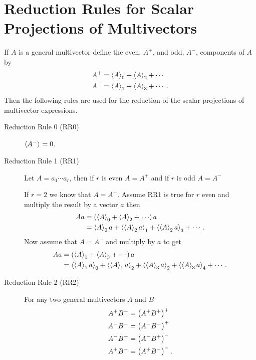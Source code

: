 \chapter{Reduction Rules for Scalar Projections of Multivectors}\label{RRrules}
If $A$ is a general multivector define the even, $A^{+}$, and odd, $A^{-}$, components of $A$ by
\begin{align}
	A^{+} &= \left \langle {A} \right \rangle_{0}+\left \langle {A} \right \rangle_{2}+\cdots \\
	A^{-} &= \left \langle {A} \right \rangle_{1}+\left \langle {A} \right \rangle_{3}+\cdots. 
\end{align}
Then the following rules are used for the reduction of the scalar projections of multivector expressions.
\begin{description}
	\item[Reduction Rule 0 (RR0)] $\left \langle {A^{-}} \right \rangle_{} = 0$. 
	\item[Reduction Rule 1 (RR1)] Let $A=a_{1}\cdots a_{r}$, then if $r$ is even $A = A^{+}$ and if $r$ is odd $A = A^{-}$
	
	If $r=2$ we know that $A=A^{+}$.  Assume RR1 is true for $r$ even and multiply the result by a vector $a$ then
	\begin{align}
		Aa &= \left ( {\left \langle {A} \right \rangle_{0}+\left \langle {A} \right \rangle_{2}+\cdots} \right ) a \nonumber \\
		   &= \left \langle {A} \right \rangle_{0}a+\left \langle {\left \langle {A} \right \rangle_{2}a} \right \rangle_{1}+\left \langle {\left \langle {A} \right \rangle_{2}a} \right \rangle_{3}+\cdots. 
	\end{align}
	Now assume that $A=A^{-}$ and multiply by $a$ to get
\begin{align}
		Aa &= \left ( {\left \langle {A} \right \rangle_{1}+\left \langle {A} \right \rangle_{3}+\cdots} \right ) a \nonumber \\
		   &= \left \langle {\left \langle {A} \right \rangle_{1}a} \right \rangle_{0}+\left \langle {\left \langle {A} \right \rangle_{1}a} \right \rangle_{2}+\left \langle {\left \langle {A} \right \rangle_{3}a} \right \rangle_{2}+\left \langle {\left \langle {A} \right \rangle_{3}a} \right \rangle_{4}+\cdots. 
	\end{align}	
	\item[Reduction Rule 2 (RR2)] For any two general multivectors $A$ and $B$
		\begin{align}
			A^{+}B^{+} &= \left ( {A^{+}B^{+}} \right )^{+} \\
			A^{-}B^{-} &= \left ( {A^{-}B^{-}} \right )^{+} \\
            A^{-}B^{+} &= \left ( {A^{-}B^{+}} \right )^{-} \\
			A^{+}B^{-} &= \left ( {A^{+}B^{-}} \right )^{-}.			
		\end{align}
		

\end{description}
